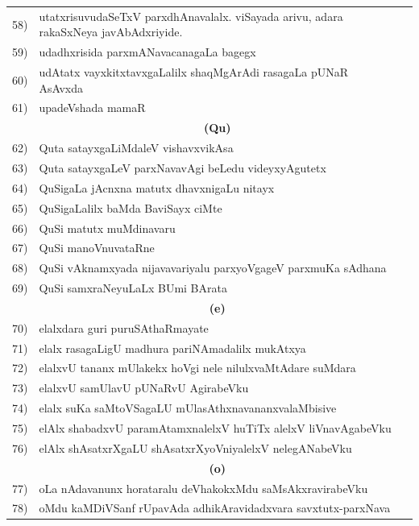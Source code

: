 {\begin{longtable}{@{}cp{7.4cm}r}
58) & utatxrisuvudaSeTxV parxdhAnavalalx. viSayada arivu, adara rakaSxNeya javAbAdxriyide.& \pageref{page176}\\
59) & udadhxrisida parxmANavacanagaLa bagegx   & \pageref{page229}\\
60) & udAtatx vayxkitxtavxgaLalilx shaqMgArAdi rasagaLa pUNaR AsAvxda  & \pageref{page229}\\
61) & upadeVshada mamaR  & \pageref{page83}\\[0.5cm]
    &  \multicolumn{1}{c}{\textbf{(Qu)}} & \\[0.5cm] 
62) & Quta satayxgaLiMdaleV vishavxvikAsa  & \pageref{page87}\\   
63) & Quta satayxgaLeV parxNavavAgi beLedu videyxyAgutetx & \pageref{page87}\\
64) & QuSigaLa jAcnxna matutx dhavxnigaLu nitayx & \pageref{page122}\\
65) & QuSigaLalilx baMda BaviSayx ciMte & \pageref{page106}\\
66) & QuSi matutx muMdinavaru & \pageref{page123}\\
67)  & QuSi manoVnuvataRne & \pageref{page114}\\
68) & QuSi vAknamxyada nijavavariyalu parxyoVgageV parxmuKa sAdhana & \pageref{page143}\\
69)  & QuSi samxraNeyuLaLx BUmi BArata & \pageref{page104}\\[0.3cm]
     &  \multicolumn{1}{c}{\textbf{(e)}} & \\[0.3cm]
70) & elalxdara guri puruSAthaRmayate & \pageref{page96}\\
71) & elalx rasagaLigU madhura pariNAmadalilx mukAtxya & \pageref{page231}\\
72)  & elalxvU tananx mUlakekx hoVgi nele nilulxvaMtAdare suMdara & \pageref{page246}\\
73) & elalxvU samUlavU pUNaRvU AgirabeVku & \pageref{page190}\\
74)  & elalx suKa saMtoVSagaLU mUlasAthxnavananxvalaMbisive & \pageref{page194}\\
75) & elAlx shabadxvU paramAtamxnalelxV huTiTx alelxV liVnavAgabeVku & \pageref{page182}\\
76) & elAlx shAsatxrXgaLU shAsatxrXyoVniyalelxV nelegANabeVku & \pageref{page179}\\[0.3cm]  
    &  \multicolumn{1}{c}{\bf(o)} & \\[0.3cm]  
77) & oLa nAdavanunx horataralu deVhakokxMdu saMsAkxravirabeVku &  \pageref{page130}\\
78) & oMdu kaMDiVSanf rUpavAda adhikAravidadxvara savxtutx-parxNava & \pageref{page140}\\

\end{longtable}}
